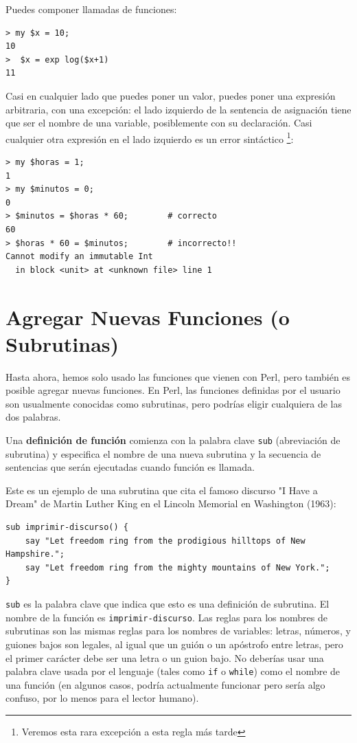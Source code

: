 Puedes componer llamadas de funciones:

\begin{verbatim}
> my $x = 10;
10
>  $x = exp log($x+1)
11
\end{verbatim}
%
Casi en cualquier lado que puedes poner un valor, puedes poner
una expresión arbitraria, con una excepción: el lado izquierdo 
de la sentencia de asignación tiene que ser el nombre de una
variable, posiblemente con su declaración. Casi cualquier otra expresión
en el lado izquierdo es un error sintáctico \footnote{Veremos esta rara
excepción a esta regla más tarde}:


\begin{verbatim}
> my $horas = 1;
1
> my $minutos = 0;
0
> $minutos = $horas * 60;        # correcto 
60
> $horas * 60 = $minutos;        # incorrecto!!
Cannot modify an immutable Int
  in block <unit> at <unknown file> line 1
\end{verbatim}
%


\section{Agregar Nuevas Funciones (o Subrutinas)}

Hasta ahora, hemos solo usado las funciones que vienen con Perl,
pero también es posible agregar nuevas funciones. En Perl, las 
funciones definidas por el usuario son usualmente conocidas 
como subrutinas, pero podrías eligir cualquiera de las dos
palabras. 

Una {\bf definición de función} comienza con la palabra clave 
{\tt sub} (abreviación de subrutina) y especifica el nombre de una
nueva subrutina y la secuencia de sentencias que serán ejecutadas
cuando función es llamada.

Este es un ejemplo de una subrutina que cita el famoso discurso
"I Have a Dream" de Martin Luther King en el Lincoln Memorial en
Washington (1963):

\begin{verbatim}
sub imprimir-discurso() {
    say "Let freedom ring from the prodigious hilltops of New Hampshire.";
    say "Let freedom ring from the mighty mountains of New York.";
}
\end{verbatim}
%
{\tt sub} es la palabra clave que indica que esto es una definición 
de subrutina. El nombre de la función es \verb|imprimir-discurso|.
Las reglas para los nombres de subrutinas son las mismas reglas 
para los nombres de variables: letras, números, y guiones bajos son
legales, al igual que un guión o un apóstrofo entre letras, pero
el primer carácter debe ser una letra o un guion bajo. No deberías
usar una palabra clave usada por el lenguaje (tales como {\tt if} 
o {\tt while}) como el nombre de una función (en algunos casos, podría
actualmente funcionar pero sería algo confuso, por lo menos 
para el lector humano).


